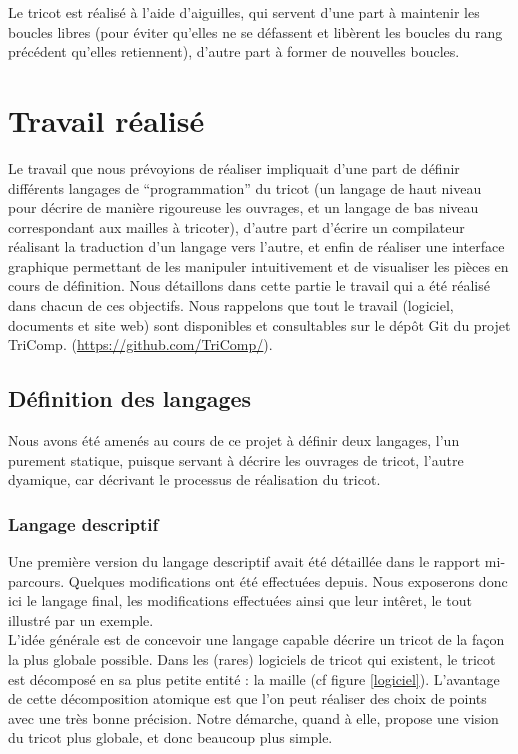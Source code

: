\documentclass{article}
\begin{document}
Le tricot est réalisé à l'aide d'aiguilles, qui servent d'une part à maintenir les boucles libres (pour éviter qu'elles ne se défassent et libèrent les boucles du 
rang précédent qu'elles retiennent), d'autre part à former de nouvelles boucles.

\newpage

\section{Travail réalisé}

Le travail que nous prévoyions de réaliser impliquait d'une part de définir différents langages de ``programmation'' du tricot (un langage de haut niveau pour 
décrire de manière rigoureuse les ouvrages, et un langage de bas niveau correspondant aux mailles à tricoter), d'autre part d'écrire un compilateur réalisant la 
traduction d'un langage vers l'autre, et enfin de réaliser une interface graphique permettant de les manipuler intuitivement et de visualiser les pièces en cours de 
définition.
Nous détaillons dans cette partie le travail qui a été réalisé dans chacun de ces objectifs. Nous rappelons que tout le travail (logiciel, documents et site web) sont disponibles et consultables sur le dépôt Git du projet TriComp. (\url{https://github.com/TriComp/}).

\subsection{Définition des langages}

Nous avons été amenés au cours de ce projet à définir deux langages, l'un purement statique, puisque servant à décrire les ouvrages de tricot, l'autre dyamique, car 
décrivant le processus de réalisation du tricot.

\subsubsection{Langage descriptif}

Une première version du langage descriptif avait été détaillée dans le rapport mi-parcours. Quelques modifications ont été effectuées depuis. Nous exposerons donc ici le langage final, les modifications effectuées ainsi que leur intêret, le tout illustré par un exemple. \\

L'idée générale est de concevoir une langage capable décrire un tricot de la façon la plus globale possible. Dans les (rares) logiciels de tricot qui existent, le tricot est décomposé en sa plus petite entité : la maille (cf figure \ref{logiciel}). L'avantage de cette décomposition atomique est que l'on peut réaliser des choix de points avec une très bonne précision. Notre démarche, quand à elle, propose une vision du tricot plus globale, et donc beaucoup plus simple.
\end{document}
